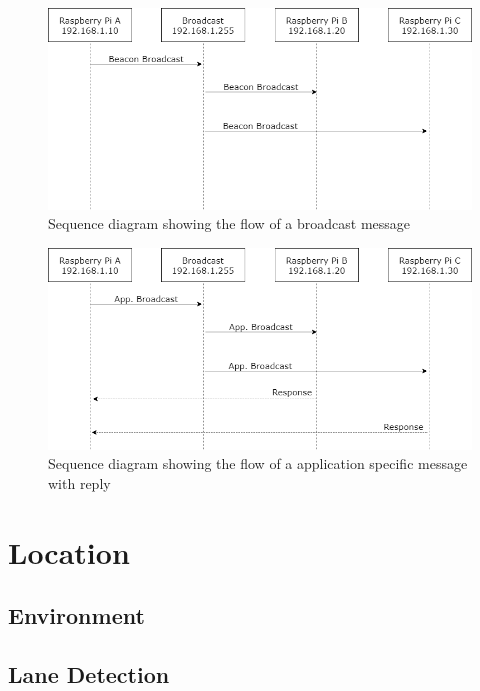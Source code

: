 \begin{figure}
\centering
\includegraphics[width=12cm]{figs/Broadcast-Message.png}
\caption{Sequence diagram showing the flow of a broadcast message}
\label{fig:broadcast-message}
\end{figure}

\begin{figure}
\centering
\includegraphics[width=12cm]{figs/App-Specific-Message.png}
\caption{Sequence diagram showing the flow of a application specific message with reply}
\label{fig:app-message}
\end{figure}

\section{Location}

\subsection{Environment}

\subsection{Lane Detection}

